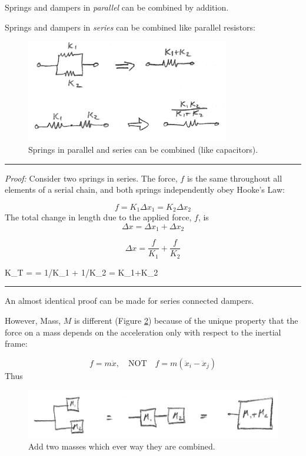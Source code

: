 Springs and dampers in {\it parallel} can be combined by addition.

Springs and dampers in {\it series}   can be combined like parallel resistors:

\begin{figure}[h]\centering
\includegraphics[width=3.5in]{figs02/00723a.png}
\caption{Springs in parallel and series can be combined (like capacitors).}\label{seriessprings}
\end{figure}


\hrule
{\it Proof:}
Consider two springs in series.
The force, $f$ is the same throughout all elements of a serial chain, and both springs independently obey Hooke's Law:

\[
f = K_1\Delta x_1 = K_2\Delta x_2
\]
The total change in length due to the applied force, $f$, is
\[
\Delta x = \Delta x_1 + \Delta x_2
\]

\[
\Delta x = \frac{f}{K_1} + \frac{f}{K_2}
\]

\bq
K_T =  =   {1/K_1 + 1/K_2} =  {K_1+K_2}
\eq
\hrule

An almost identical proof can be made for series connected dampers.

However, Mass, $M$ is different (Figure \ref{addtwomasses}) because of the unique property that the force on a mass depends on the acceleration only with respect to the inertial frame:

\[
f = m\ddot{x}, \quad \mathrm{NOT} \quad f = m(\ddot{x}_i - \ddot{x}_j)
\]
Thus


\begin{figure}[h]\centering
\includegraphics[width=4.5in]{figs02/00724a.png}
\caption{Add two masses which ever way they are combined.}\label{addtwomasses}
\end{figure}


